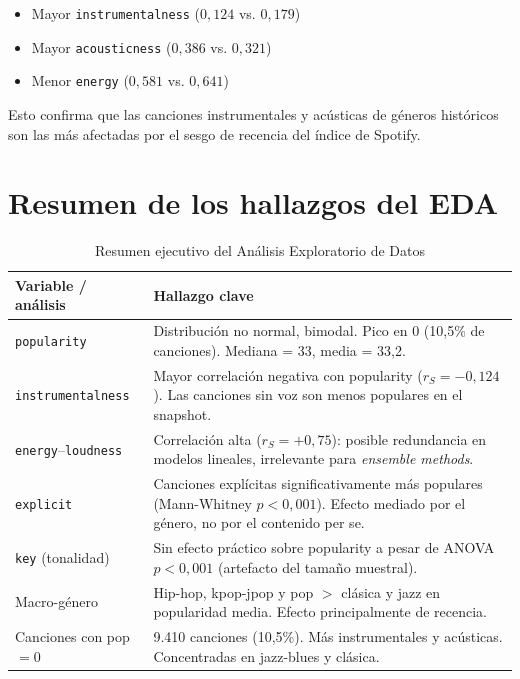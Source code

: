 \documentclass[12pt, a4paper, twoside]{book}
\theoremstyle{definition}
\begin{document}
\begin{itemize}
  \item Mayor \texttt{instrumentalness} ($0{,}124$ vs. $0{,}179$)
  \item Mayor \texttt{acousticness} ($0{,}386$ vs. $0{,}321$)
  \item Menor \texttt{energy} ($0{,}581$ vs. $0{,}641$)
\end{itemize}

Esto confirma que las canciones instrumentales y acústicas de géneros históricos
son las más afectadas por el sesgo de recencia del índice de Spotify.

\section{Resumen de los hallazgos del EDA}

\begin{table}[H]
\centering
\caption{Resumen ejecutivo del Análisis Exploratorio de Datos}
\label{tab:eda_resumen}
\small
{}
\begin{tabular}{p{3.5cm}p{9.5cm}}
\toprule
\textbf{Variable / análisis} & \textbf{Hallazgo clave} \\
\midrule
\texttt{popularity} &
  Distribución no normal, bimodal. Pico en 0 (10,5\% de canciones).
  Mediana = 33, media = 33,2. \\
\texttt{instrumentalness} &
  Mayor correlación negativa con popularity ($r_S = -0{,}124$).
  Las canciones sin voz son menos populares en el snapshot. \\
\texttt{energy}--\texttt{loudness} &
  Correlación alta ($r_S = +0{,}75$): posible redundancia en modelos lineales,
  irrelevante para \textit{ensemble methods}. \\
\texttt{explicit} &
  Canciones explícitas significativamente más populares (Mann-Whitney $p < 0{,}001$).
  Efecto mediado por el género, no por el contenido per se. \\
\texttt{key} (tonalidad) &
  Sin efecto práctico sobre popularity a pesar de ANOVA $p < 0{,}001$
  (artefacto del tamaño muestral). \\
Macro-género &
  Hip-hop, kpop-jpop y pop $>$ clásica y jazz en popularidad media.
  Efecto principalmente de recencia. \\
Canciones con pop $= 0$ &
  9.410 canciones (10,5\%). Más instrumentales y acústicas. Concentradas
  en jazz-blues y clásica. \\
\bottomrule
\end{tabular}
\end{table}
\end{document}
